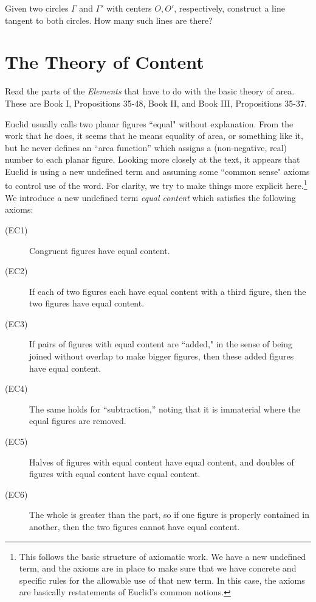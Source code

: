\begin{challenge}\label{chal:double-tangent}
Given two circles $\Gamma$ and $\Gamma'$ with centers $O, O'$, respectively, construct a line tangent to both circles.
How many such lines are there?
\end{challenge}



\chapter{The Theory of Content}

Read the parts of the \emph{Elements} that have to do with the basic theory of area. These are Book I, Propositions 35-48, Book II, and Book III, Propositions 35-37.

Euclid usually calls two planar figures ``equal" without explanation. 
From the work that he does, it seems that he means equality of area, or something like it, but he never defines an ``area function'' which assigns a (non-negative, real) number to each planar figure. 
Looking more closely at the text, it appears that Euclid is using a new undefined term and assuming some ``common sense" axioms to control use of the word. 
For clarity, we try to make things more explicit here.\footnote{This follows the basic structure of axiomatic work. We have a new undefined term, and the axioms are in place to make sure that we have concrete and specific rules for the allowable use of that new term. In this case, the axioms are basically restatements of Euclid's common notions.}
We introduce a new undefined term \emph{equal content} which satisfies the following axioms:
\begin{description}
\item[(EC1)] Congruent figures have equal content.
\item[(EC2)] If each of two figures each have equal content with a third figure, then the two figures have equal content.
\item[(EC3)] If pairs of figures with equal content are ``added," in the sense of being joined without overlap to make bigger figures, then these added figures have equal content.
\item[(EC4)] The same holds for ``subtraction,'' noting that it is immaterial where the equal figures are removed.
\item[(EC5)] Halves of figures with equal content have equal content, and doubles of figures with equal content have equal content.
\item[(EC6)] The whole is greater than the part, so if one figure is properly contained in another, then the two figures cannot have equal content.
\end{description}

